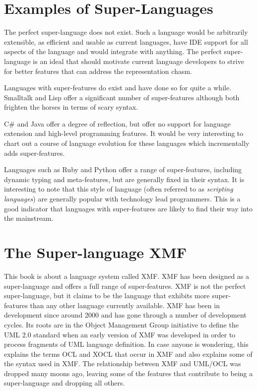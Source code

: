 \section{Examples of Super-Languages}

The perfect super-language does not exist. Such a language would be
arbitrarily extensible, as efficient and usable as current languages,
have IDE support for all aspects of the language and would integrate
with anything. The perfect super-language is an ideal that should
motivate current language developers to strive for better features
that can address the representation chasm.

Languages with super-features do exist and have done so for quite
a while. Smalltalk and Lisp offer a significant number of super-features
although both frighten the horses in terms of scary syntax. 

C\# and Java offer a degree of reflection, but offer no support for
language extension and high-level programming features. It would be
very interesting to chart out a course of language evolution for these
languages which incrementally adds super-features.

Languages such as Ruby and Python offer a range of super-features,
including dynamic typing and meta-features, but are generally fixed
in their syntax. It is interesting to note that this style of language
(often referred to as \emph{scripting languages}) are generally popular
with technology lead programmers. This is a good indicator that languages
with super-features are likely to find their way into the mainstream.


\section{The Super-language XMF}

This book is about a language system called XMF. XMF has been designed
as a super-language and offers a full range of super-features. XMF
is not the perfect super-language, but it claims to be the language
that exhibits more super-features than any other language currently
available. XMF has been in development since around 2000 and has gone
through a number of development cycles. Its roots are in the Object
Management Group initiative to define the UML 2.0 standard when an
early version of XMF was developed in order to process fragments of
UML language definition. In case anyone is wondering, this explains
the terms OCL and XOCL that occur in XMF and also explains some of
the syntax used in XMF. The relationship between XMF and UML/OCL was
dropped many moons ago, leaving some of the features that contribute
to being a super-language and dropping all others.

